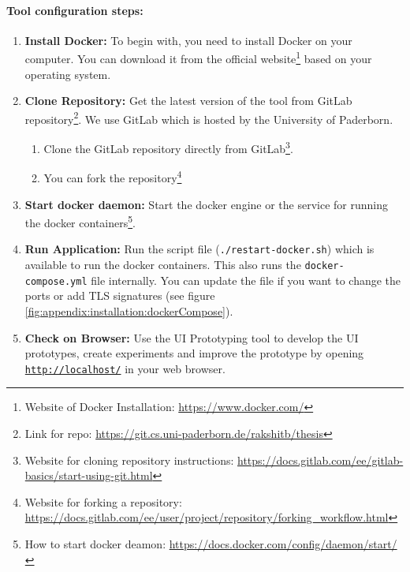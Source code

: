 \paragraph{Tool configuration steps:}

\begin{enumerate}
\item \textbf{Install Docker:} To begin with, you need to install Docker on your computer. 
You can download it from the official website\footnote{Website of Docker Installation: \url{https://www.docker.com/}} based on your operating system.
\clearpage
\item \textbf{Clone Repository:} Get the latest version of the tool from GitLab repository\footnote{Link for repo: \url{https://git.cs.uni-paderborn.de/rakshitb/thesis}}. We use GitLab which is hosted by the University of Paderborn.
\begin{enumerate}
	\item Clone the GitLab repository directly from GitLab\footnote{Website for cloning repository instructions: \url{https://docs.gitlab.com/ee/gitlab-basics/start-using-git.html}}.
	\item You can fork the repository\footnote{Website for forking a repository: \url{https://docs.gitlab.com/ee/user/project/repository/forking_workflow.html}} 
\end{enumerate}
\item \textbf{Start docker daemon:} Start the docker engine or the service for running the docker containers\footnote{How to start docker deamon: \url{https://docs.docker.com/config/daemon/start/}}.
\item \textbf{Run Application:} Run the script file (\texttt{./restart-docker.sh}) which is available to run the docker containers. This also runs the \texttt{docker-compose.yml} file internally. You can update the file if you want to change the ports or add TLS signatures (see figure \ref{fig:appendix:installation:dockerCompose}).
\item \textbf{Check on Browser:} Use the UI Prototyping tool to develop the UI prototypes, create experiments and improve the prototype by opening \texttt{\url{http://localhost/}} in your web browser.
\end{enumerate}